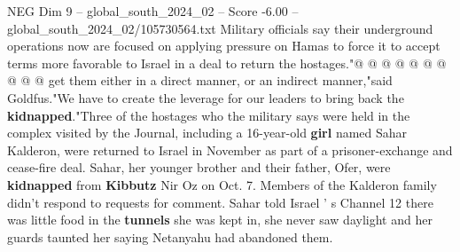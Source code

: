 \begin{textsample}{NEG Dim 9 – global\_south\_2024\_02 – Score -6.00 – global\_south\_2024\_02/105730564.txt}
Military officials say their underground operations now are focused on applying pressure on Hamas to force it to accept terms more favorable to Israel in a deal to return the hostages."@ @ @ @ @ @ @ @ @ @ get them either in a direct manner, or an indirect manner,"said Goldfus."We have to create the leverage for our leaders to bring back the \textbf{kidnapped}."Three of the hostages who the military says were held in the complex visited by the Journal, including a 16-year-old \textbf{girl} named Sahar Kalderon, were returned to Israel in November as part of a prisoner-exchange and cease-fire deal.
Sahar, her younger brother and their father, Ofer, were \textbf{kidnapped} from \textbf{Kibbutz} Nir Oz on Oct. 7.
Members of the Kalderon family didn't respond to requests for comment.
Sahar told Israel ' s Channel 12 there was little food in the \textbf{tunnels} she was kept in, she never saw daylight and her guards taunted her saying Netanyahu had abandoned them.

\end{textsample}
